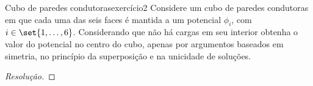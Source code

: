 \begin{exercício}{Cubo de paredes condutoras}{exercício2}
    Considere um cubo de paredes condutoras em que cada uma das seis faces é mantida a um potencial \(\phi_i\), com \(i \in \set{1,\dots, 6}\). Considerando que não há cargas em seu interior obtenha o valor do potencial no centro do cubo, apenas por argumentos baseados em simetria, no princípio da superposição e na unicidade de soluções.
\end{exercício}
\begin{proof}[Resolução]

\end{proof}

